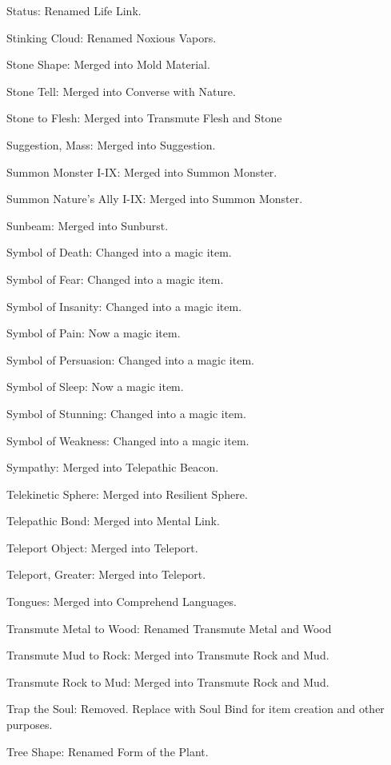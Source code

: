 {\begin{list}{}{\leftmargin=1em}
 \item Status: Renamed Life Link.
 \item Stinking Cloud: Renamed Noxious Vapors.
 \item Stone Shape: Merged into Mold Material.
 \item Stone Tell: Merged into Converse with Nature.
 \item Stone to Flesh: Merged into Transmute Flesh and Stone
 \item Suggestion, Mass: Merged into Suggestion.
 \item Summon Monster I-IX: Merged into Summon Monster.
 \item Summon Nature's Ally I-IX: Merged into Summon Monster.
 \item Sunbeam: Merged into Sunburst.
 \item Symbol of Death: Changed into a magic item.
 \item Symbol of Fear: Changed into a magic item.
 \item Symbol of Insanity: Changed into a magic item.
 \item Symbol of Pain: Now a magic item.
 \item Symbol of Persuasion: Changed into a magic item.
 \item Symbol of Sleep: Now a magic item.
 \item Symbol of Stunning: Changed into a magic item.
 \item Symbol of Weakness: Changed into a magic item.
 \item Sympathy: Merged into Telepathic Beacon.
 \item Telekinetic Sphere: Merged into Resilient Sphere.
 \item Telepathic Bond: Merged into Mental Link.
 \item Teleport Object: Merged into Teleport.
 \item Teleport, Greater: Merged into Teleport.
 \item Tongues: Merged into Comprehend Languages.
 \item Transmute Metal to Wood: Renamed Transmute Metal and Wood
 \item Transmute Mud to Rock: Merged into Transmute Rock and Mud.
 \item Transmute Rock to Mud: Merged into Transmute Rock and Mud.
 \item Trap the Soul: Removed. Replace with Soul Bind for item creation and other purposes.
 \item Tree Shape: Renamed Form of the Plant.

\end{list}}
